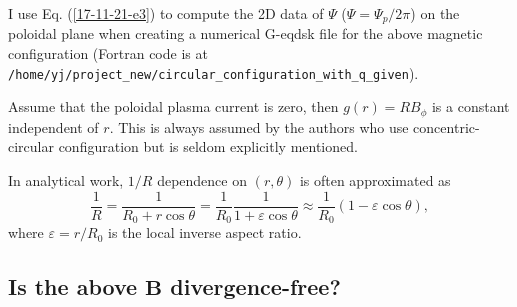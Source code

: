 \documentclass{llncs}
\begin{document}
I use Eq. (\ref{17-11-21-e3}) to compute the 2D data of $\Psi$ ($\Psi = \Psi_p
/ 2 \pi$) on the poloidal plane when creating a numerical G-eqdsk file for the
above magnetic configuration (Fortran code is at
{\texttt{/home/yj/project\_new/circular\_configuration\_with\_q\_given}}).

Assume that the poloidal plasma current is zero, then $g (r) = R B_{\phi}$ is
a constant independent of $r$. This is always assumed by the authors who use
concentric-circular configuration but is seldom explicitly mentioned.

In analytical work, $1 / R$ dependence on $(r, \theta)$ is often approximated
as
\[ \frac{1}{R} = \frac{1}{R_0 + r \cos \theta} = \frac{1}{R_0}  \frac{1}{1 +
   \varepsilon \cos \theta} \approx \frac{1}{R_0} (1 - \varepsilon \cos
   \theta), \]
where $\varepsilon = r / R_0$ is the local inverse aspect ratio.

\subsection{Is the above $\mathbf{B}$ divergence-free?}
\end{document}
